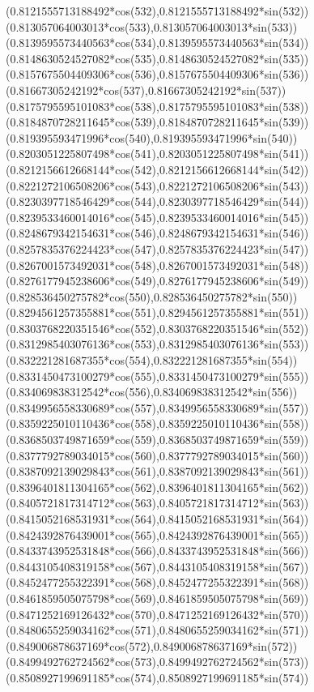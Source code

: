{({0.8121555713188492*cos(532)},{0.8121555713188492*sin(532)})
({0.813057064003013*cos(533)},{0.813057064003013*sin(533)})
({0.8139595573440563*cos(534)},{0.8139595573440563*sin(534)})
({0.8148630524527082*cos(535)},{0.8148630524527082*sin(535)})
({0.8157675504409306*cos(536)},{0.8157675504409306*sin(536)})
({0.81667305242192*cos(537)},{0.81667305242192*sin(537)})
({0.8175795595101083*cos(538)},{0.8175795595101083*sin(538)})
({0.8184870728211645*cos(539)},{0.8184870728211645*sin(539)})
({0.819395593471996*cos(540)},{0.819395593471996*sin(540)})
({0.8203051225807498*cos(541)},{0.8203051225807498*sin(541)})
({0.8212156612668144*cos(542)},{0.8212156612668144*sin(542)})
({0.8221272106508206*cos(543)},{0.8221272106508206*sin(543)})
({0.8230397718546429*cos(544)},{0.8230397718546429*sin(544)})
({0.8239533460014016*cos(545)},{0.8239533460014016*sin(545)})
({0.8248679342154631*cos(546)},{0.8248679342154631*sin(546)})
({0.8257835376224423*cos(547)},{0.8257835376224423*sin(547)})
({0.8267001573492031*cos(548)},{0.8267001573492031*sin(548)})
({0.8276177945238606*cos(549)},{0.8276177945238606*sin(549)})
({0.828536450275782*cos(550)},{0.828536450275782*sin(550)})
({0.8294561257355881*cos(551)},{0.8294561257355881*sin(551)})
({0.8303768220351546*cos(552)},{0.8303768220351546*sin(552)})
({0.8312985403076136*cos(553)},{0.8312985403076136*sin(553)})
({0.832221281687355*cos(554)},{0.832221281687355*sin(554)})
({0.8331450473100279*cos(555)},{0.8331450473100279*sin(555)})
({0.834069838312542*cos(556)},{0.834069838312542*sin(556)})
({0.8349956558330689*cos(557)},{0.8349956558330689*sin(557)})
({0.8359225010110436*cos(558)},{0.8359225010110436*sin(558)})
({0.8368503749871659*cos(559)},{0.8368503749871659*sin(559)})
({0.8377792789034015*cos(560)},{0.8377792789034015*sin(560)})
({0.8387092139029843*cos(561)},{0.8387092139029843*sin(561)})
({0.8396401811304165*cos(562)},{0.8396401811304165*sin(562)})
({0.8405721817314712*cos(563)},{0.8405721817314712*sin(563)})
({0.8415052168531931*cos(564)},{0.8415052168531931*sin(564)})
({0.8424392876439001*cos(565)},{0.8424392876439001*sin(565)})
({0.8433743952531848*cos(566)},{0.8433743952531848*sin(566)})
({0.8443105408319158*cos(567)},{0.8443105408319158*sin(567)})
({0.8452477255322391*cos(568)},{0.8452477255322391*sin(568)})
({0.8461859505075798*cos(569)},{0.8461859505075798*sin(569)})
({0.8471252169126432*cos(570)},{0.8471252169126432*sin(570)})
({0.8480655259034162*cos(571)},{0.8480655259034162*sin(571)})
({0.849006878637169*cos(572)},{0.849006878637169*sin(572)})
({0.8499492762724562*cos(573)},{0.8499492762724562*sin(573)})
({0.8508927199691185*cos(574)},{0.8508927199691185*sin(574)})
}

